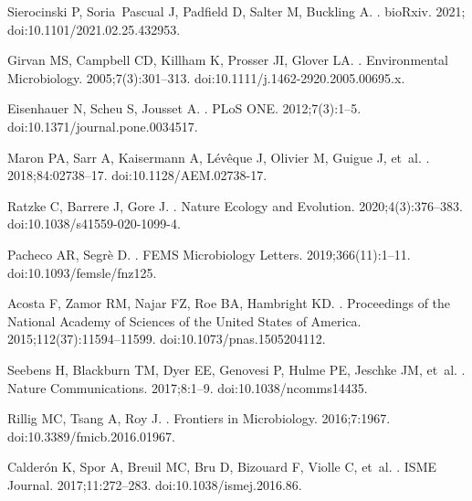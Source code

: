 \documentclass[10pt,letterpaper]{article}
\begin{document}
\begin{thebibliography}{10}
Sierocinski P, Soria~Pascual J, Padfield D, Salter M, Buckling A.
.
\newblock bioRxiv. 2021;
\newblock doi:{10.1101/2021.02.25.432953}.

Girvan MS, Campbell CD, Killham K, Prosser JI, Glover LA.
.
\newblock Environmental Microbiology. 2005;7(3):301--313.
\newblock doi:{10.1111/j.1462-2920.2005.00695.x}.

Eisenhauer N, Scheu S, Jousset A.
.
\newblock PLoS ONE. 2012;7(3):1--5.
\newblock doi:{10.1371/journal.pone.0034517}.

Maron PA, Sarr A, Kaisermann A, Lévêque J, Olivier M, Guigue J, et~al.
. 2018;84:02738--17.
\newblock doi:{10.1128/AEM.02738-17}.

Ratzke C, Barrere J, Gore J.
.
\newblock Nature Ecology and Evolution. 2020;4(3):376--383.
\newblock doi:{10.1038/s41559-020-1099-4}.

Pacheco AR, Segrè D.
.
\newblock FEMS Microbiology Letters. 2019;366(11):1--11.
\newblock doi:{10.1093/femsle/fnz125}.

Acosta F, Zamor RM, Najar FZ, Roe BA, Hambright KD.
.
\newblock Proceedings of the National Academy of Sciences of the United States of America. 2015;112(37):11594--11599.
\newblock doi:{10.1073/pnas.1505204112}.

Seebens H, Blackburn TM, Dyer EE, Genovesi P, Hulme PE, Jeschke JM, et~al.
.
\newblock Nature Communications. 2017;8:1--9.
\newblock doi:{10.1038/ncomms14435}.

Rillig MC, Tsang A, Roy J.
.
\newblock Frontiers in Microbiology. 2016;7:1967.
\newblock doi:{10.3389/fmicb.2016.01967}.

Calderón K, Spor A, Breuil MC, Bru D, Bizouard F, Violle C, et~al.
.
\newblock ISME Journal. 2017;11:272--283.
\newblock doi:{10.1038/ismej.2016.86}.


\end{thebibliography}
\end{document}
